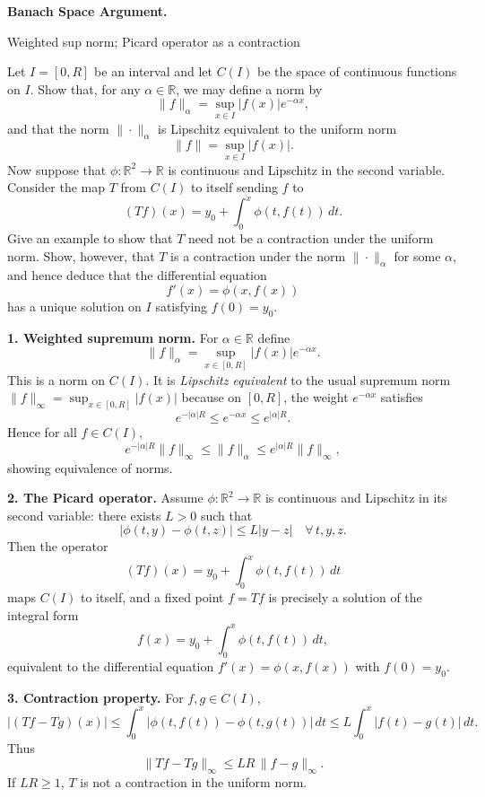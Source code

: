 \begin{problem}[CP-II-0349]
\label{prob:cp-ii-0349}
\textbf{Banach Space Argument.}

\hspace*{1.5em}Weighted sup norm; Picard operator as a contraction

Let $I=[0,R]$ be an interval and let $C(I)$ be the space of continuous functions on $I$.
Show that, for any $\alpha\in\mathbb{R}$, we may define a norm by
\[
\|f\|_\alpha=\sup_{x\in I}|f(x)|e^{-\alpha x},
\]
and that the norm $\|\cdot\|_\alpha$ is Lipschitz equivalent to the uniform norm
\[
\|f\|=\sup_{x\in I}|f(x)|.
\]
Now suppose that $\phi:\mathbb{R}^2\to\mathbb{R}$ is continuous and Lipschitz in the second variable.
Consider the map $T$ from $C(I)$ to itself sending $f$ to
\[
(Tf)(x)=y_0+\int_0^x \phi(t,f(t))\,dt.
\]
Give an example to show that $T$ need not be a contraction under the uniform norm.
Show, however, that $T$ is a contraction under the norm $\|\cdot\|_\alpha$ for some $\alpha$, and hence deduce that the differential equation
\[
f'(x)=\phi(x,f(x))
\]
has a unique solution on $I$ satisfying $f(0)=y_0$.

\bigskip
\bigskip

\textbf{1. Weighted supremum norm.}
For $\alpha\in\mathbb{R}$ define
\[
\|f\|_\alpha=\sup_{x\in[0,R]}|f(x)|e^{-\alpha x}.
\]
This is a norm on $C(I)$. It is \emph{Lipschitz equivalent} to the usual supremum norm
\(\|f\|_\infty=\sup_{x\in[0,R]}|f(x)|\)
because on $[0,R]$, the weight $e^{-\alpha x}$ satisfies
\[
e^{-|\alpha|R}\le e^{-\alpha x}\le e^{|\alpha|R}.
\]
Hence for all $f\in C(I)$,
\[
e^{-|\alpha|R}\|f\|_\infty \le \|f\|_\alpha \le e^{|\alpha|R}\|f\|_\infty,
\]
showing equivalence of norms.

\bigskip

\textbf{2. The Picard operator.}
Assume $\phi:\mathbb{R}^2\to\mathbb{R}$ is continuous and Lipschitz in its second variable:
there exists $L>0$ such that
\[
|\phi(t,y)-\phi(t,z)|\le L|y-z| \quad \forall\, t,y,z.
\]
Then the operator
\[
(Tf)(x)=y_0+\int_0^x \phi(t,f(t))\,dt
\]
maps $C(I)$ to itself, and a fixed point $f=Tf$ is precisely a solution of the integral form
\[
f(x)=y_0+\int_0^x \phi(t,f(t))\,dt,
\]
equivalent to the differential equation $f'(x)=\phi(x,f(x))$ with $f(0)=y_0$.

\bigskip

\textbf{3. Contraction property.}
For $f,g\in C(I)$,
\[
|(Tf-Tg)(x)|\le \int_0^x |\phi(t,f(t))-\phi(t,g(t))|\,dt
\le L\int_0^x |f(t)-g(t)|\,dt.
\]
Thus
\[
\|Tf-Tg\|_\infty\le LR\,\|f-g\|_\infty.
\]
If $LR\ge1$, $T$ is not a contraction in the uniform norm.


\end{problem}
